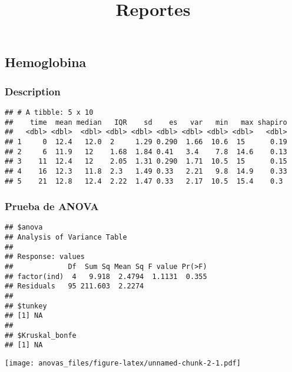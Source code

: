 \documentclass[]{article}
\title{Reportes}
\date{}
\begin{document}
\maketitle

\hypertarget{hemoglobina}{%
\subsection{Hemoglobina}\label{hemoglobina}}

\hypertarget{description}{%
\subsubsection{Description}\label{description}}

\begin{verbatim}
## # A tibble: 5 x 10
##    time  mean median   IQR    sd    es   var   min   max shapiro
##   <dbl> <dbl>  <dbl> <dbl> <dbl> <dbl> <dbl> <dbl> <dbl>   <dbl>
## 1     0  12.4   12.0  2     1.29 0.290  1.66  10.6  15      0.19
## 2     6  11.9   12    1.68  1.84 0.41   3.4    7.8  14.6    0.13
## 3    11  12.4   12    2.05  1.31 0.290  1.71  10.5  15      0.15
## 4    16  12.3   11.8  2.3   1.49 0.33   2.21   9.8  14.9    0.33
## 5    21  12.8   12.4  2.22  1.47 0.33   2.17  10.5  15.4    0.3
\end{verbatim}

\hypertarget{prueba-de-anova}{%
\subsubsection{Prueba de ANOVA}\label{prueba-de-anova}}

\begin{verbatim}
## $anova
## Analysis of Variance Table
## 
## Response: values
##             Df  Sum Sq Mean Sq F value Pr(>F)
## factor(ind)  4   9.918  2.4794  1.1131  0.355
## Residuals   95 211.603  2.2274               
## 
## $tunkey
## [1] NA
## 
## $Kruskal_bonfe
## [1] NA
\end{verbatim}

\texttt{[image: anovas\_files/figure-latex/unnamed-chunk-2-1.pdf]}
\end{document}
